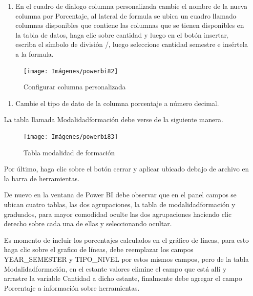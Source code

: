 \documentclass[
]{book}
\providecommand{\tightlist}{%
  \setlength{\itemsep}{0pt}\setlength{\parskip}{0pt}}
\begin{document}
\begin{enumerate}
\def\labelenumi{\arabic{enumi}.}
\setcounter{enumi}{12}
\tightlist
\item
  En el cuadro de dialogo columna personalizada cambie el nombre de la nueva columna por Porcentaje, al lateral de formula se ubica un cuadro llamado columnas disponibles que contiene las columnas que se tienen disponibles en la tabla de datos, haga clic sobre cantidad y luego en el botón insertar, escriba el símbolo de división /, luego seleccione cantidad semestre e insértela a la formula.
\end{enumerate}

\begin{figure}

{\centering \texttt{[image: Imágenes/powerbi82]} 

}

\caption{Configurar columna personalizada}\label{fig:paso13porcentajes-fig}
\end{figure}

\begin{enumerate}
\def\labelenumi{\arabic{enumi}.}
\setcounter{enumi}{13}
\tightlist
\item
  Cambie el tipo de dato de la columna porcentaje a número decimal.
\end{enumerate}

La tabla llamada Modalidadformación debe verse de la siguiente manera.

\begin{figure}

{\centering \texttt{[image: Imágenes/powerbi83]} 

}

\caption{Tabla modalidad de formación}\label{fig:tablamodalidadformacion-fig}
\end{figure}

Por último, haga clic sobre el botón cerrar y aplicar ubicado debajo de archivo en la barra de herramientas.

De nuevo en la ventana de Power BI debe observar que en el panel campos se ubican cuatro tablas, las dos agrupaciones, la tabla de modalidadformación y graduados, para mayor comodidad oculte las dos agrupaciones haciendo clic derecho sobre cada una de ellas y seleccionando ocultar.

Es momento de incluir los porcentajes calculados en el gráfico de líneas, para esto haga clic sobre el grafico de líneas, debe reemplazar los campos YEAR\_SEMESTER y TIPO\_NIVEL por estos mismos campos, pero de la tabla Modalidadformación, en el estante valores elimine el campo que está allí y arrastre la variable Cantidad a dicho estante, finalmente debe agregar el campo Porcentaje a información sobre herramientas.
\end{document}
